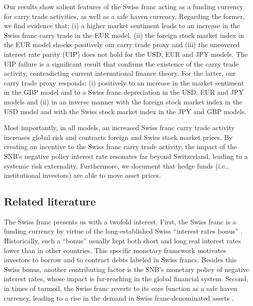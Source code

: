 \documentclass[a4paper, twoside]{templates/ociamthesis}
\begin{document}
Our results show salient features of the Swiss franc acting as a funding currency for carry trade activities, as well as a safe haven currency. Regarding the former, we find evidence that: (i) a higher market sentiment leads to an increase in the Swiss franc carry trade in the EUR model, (ii) the foreign stock market index in the EUR model shocks positively our carry trade proxy and (iii) the uncovered interest rate parity (UIP) does not hold for the USD, EUR and JPY models. The UIP failure is a significant result that confirms the existence of the carry trade activity, contradicting current international finance theory. For the latter, our carry trade proxy responds: (i) positively to an increase in the market sentiment in the GBP model and to a Swiss franc depreciation in the USD, EUR and JPY models and (ii) in an inverse manner with the foreign stock market index in the USD model and with the Swiss stock market index in the JPY and GBP models.

Most importantly, in all models, an increased Swiss franc carry trade activity increases global risk and contracts foreign and Swiss stock market prices. By creating an incentive to the Swiss franc carry trade activity, the impact of the SNB's negative policy interest rate resonates far beyond Switzerland, leading to a systemic risk externality. Furthermore, we document that hedge funds (i.e., institutional investors) are able to move asset prices.

\hypertarget{one-one}{%
\subsection{Related literature}\label{one-one}}

The Swiss franc presents us with a twofold interest. First, the Swiss franc is a funding currency by virtue of the long-established Swiss ``interest rates bonus'' \autocite{kugler2002}. Historically, such a ``bonus'' usually kept both short and long real interest rates lower than in other countries. This specific monetary framework motivates investors to borrow and to contract debts labeled in Swiss francs. Besides this Swiss bonus, another contributing factor is the SNB's monetary policy of negative interest rates, whose impact is far-reaching in the global financial system. Second, in times of turmoil, the Swiss franc reverts to its core function as a safe haven currency, leading to a rise in the demand in Swiss franc-denominated assets \autocite{ranaldo2010}.
\end{document}
